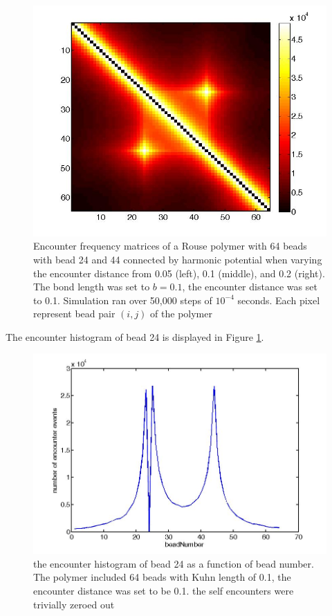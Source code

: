 \documentclass[12pt]{paper}
\begin{document}
\begin{figure}[H]
\includegraphics[scale=0.17]{encounterFrequency64BeadsConnect24And44EncounterDist0_2}
\caption{Encounter frequency matrices of a Rouse polymer with 64 beads with bead 24 and 44 connected by harmonic potential when varying the encounter distance from 0.05 (left), 0.1 (middle), and 0.2 (right). The bond length was set to $b=0.1$, the encounter distance was set to 0.1. Simulation ran over 50,000 steps of $10^{-4}$ seconds. Each pixel represent bead pair $(i,j)$ of the polymer}
\end{figure}

The encounter histogram of bead 24 is displayed in Figure \ref{encounterHistBead24connect24And44EncounterDist0_1}.
\begin{figure}[H]\label{encounterHistBead24connect24And44EncounterDist0_1}
\includegraphics[scale=0.4]{encounterHistBead24connect24And44EncounterDist0_1}
\caption{the encounter histogram of bead 24 as a function of bead number. The polymer included 64 beads with Kuhn length of 0.1, the encounter distance was set to be 0.1. the self encounters were trivially zeroed out}
\end{figure}
\end{document}
